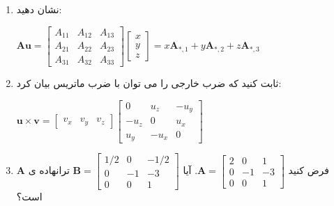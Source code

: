 {\begin{spacing}{1.5}
\begin{enumerate}[label=\textbf{\arabic*}.]
            \item {نشان دهید: \\
                \begin{center}
                    $\textbf{Au}=\begin{bmatrix}
                                     A_{11} & A_{12} & A_{13} \\
                                     A_{21} & A_{22} & A_{23} \\
                                     A_{31} & A_{32} & A_{33}
                    \end{bmatrix}\begin{bmatrix}
                                     x \\
                                     y \\
                                     z
                    \end{bmatrix}=x\textbf{A}_{*,1}+y\textbf{A}_{*,2}+z\textbf{A}_{*,3}$
                \end{center}
            }

            \item {ثابت کنید که ضرب خارجی را می توان با ضرب ماتریس بیان کرد:
                \begin{center}
                    $\textbf{u}\times\textbf{v}=\begin{bmatrix}
                                                    v_{x} & v_{y} & v_{z}
                    \end{bmatrix}\begin{bmatrix}
                                     0      & u_{z}  & -u_{y} \\
                                     -u_{z} & 0      & u_{x}  \\
                                     u_{y}  & -u_{x} & 0
                    \end{bmatrix}$
                \end{center}
            }

            \item {فرض کنید $\textbf{A}=\begin{bmatrix}
                                            2 & 0  & 1  \\
                                            0 & -1 & -3 \\
                                            0 & 0  & 1
            \end{bmatrix}$. آیا $\textbf{B}=\begin{bmatrix}
                                                1/2 & 0  & -1/2 \\
                                                0   & -1 & -3   \\
                                                0   & 0  & 1
            \end{bmatrix}$ ترانهاده ی $\textbf{A}$ است؟
            }


\end{enumerate}
\end{spacing}}
